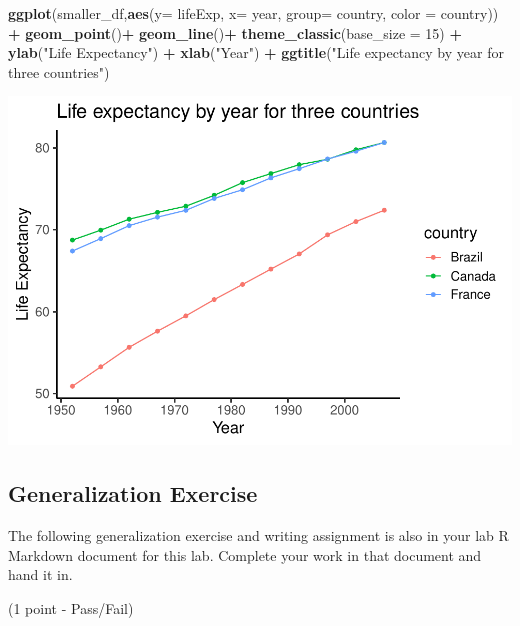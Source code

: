 \documentclass[]{book}
\newenvironment{Shaded}{\begin{snugshade}}{\end{snugshade}}
\newcommand{\KeywordTok}[1]{\textcolor[rgb]{0.13,0.29,0.53}{\textbf{#1}}}
\newcommand{\DataTypeTok}[1]{\textcolor[rgb]{0.13,0.29,0.53}{#1}}
\newcommand{\DecValTok}[1]{\textcolor[rgb]{0.00,0.00,0.81}{#1}}
\newcommand{\StringTok}[1]{\textcolor[rgb]{0.31,0.60,0.02}{#1}}
\newcommand{\OperatorTok}[1]{\textcolor[rgb]{0.81,0.36,0.00}{\textbf{#1}}}
\newcommand{\NormalTok}[1]{#1}
\begin{document}
\begin{Shaded}
\begin{Highlighting}[]
\KeywordTok{ggplot}\NormalTok{(smaller_df,}\KeywordTok{aes}\NormalTok{(}\DataTypeTok{y=}\NormalTok{ lifeExp, }\DataTypeTok{x=}\NormalTok{ year, }
                      \DataTypeTok{group=}\NormalTok{ country, }\DataTypeTok{color =}\NormalTok{ country)) }\OperatorTok{+}
\StringTok{  }\KeywordTok{geom_point}\NormalTok{()}\OperatorTok{+}\StringTok{ }
\StringTok{  }\KeywordTok{geom_line}\NormalTok{()}\OperatorTok{+}
\StringTok{  }\KeywordTok{theme_classic}\NormalTok{(}\DataTypeTok{base_size =} \DecValTok{15}\NormalTok{) }\OperatorTok{+}
\StringTok{  }\KeywordTok{ylab}\NormalTok{(}\StringTok{"Life Expectancy"}\NormalTok{) }\OperatorTok{+}\StringTok{ }
\StringTok{  }\KeywordTok{xlab}\NormalTok{(}\StringTok{"Year"}\NormalTok{) }\OperatorTok{+}
\StringTok{  }\KeywordTok{ggtitle}\NormalTok{(}\StringTok{"Life expectancy by year for three countries"}\NormalTok{)}
\end{Highlighting}
\end{Shaded}

\includegraphics{Statistics_Lab_files/figure-latex/1scatline-1.pdf}

\subsection{Generalization Exercise}\label{generalization-exercise}

The following generalization exercise and writing assignment is also in
your lab R Markdown document for this lab. Complete your work in that
document and hand it in.

(1 point - Pass/Fail)
\end{document}
